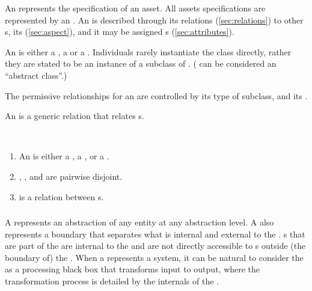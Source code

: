An  represents the specification of an asset. All assets
specifications are represented by an .
%
An  is described through its relations (\autoref{sec:relations}) to other s,
%
its  (\autoref{sec:aspect}),
%
%
and it may be assigned s (\autoref{sec:attributes}).
%

An  is either a , a  or a .
Individuals rarely instantiate the class  directly, rather
they are stated to be an instance of a subclass of
. ( can be considered an ``abstract class''.)



The permissive relationships for an  are controlled by its
type of subclass, and its .

An  is a generic relation that relates s.

\begin{axioms}
  ~
  \begin{enumerate}[resume=axioms,{label=(\arabic*)}]
  \item An  is either a , a , or a . 
  \item {}, , and  are pairwise disjoint.
  \item {} is a relation between s.
  \end{enumerate}
\end{axioms}

\subsubsection{}

A  represents an abstraction of any entity at any
abstraction level. A  also represents a boundary that
separates what is internal and external to the
. s that are part of the  are internal
to the  and are not directly accessible to s
outside (the boundary of) the .
When a  represents a system, it can be natural to
consider the  as a processing black box that transforms input
to output, where the transformation process is detailed by the internals
of the .


